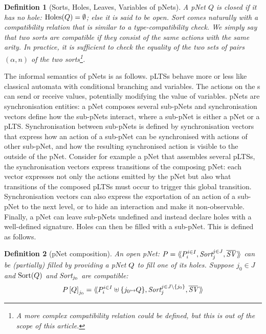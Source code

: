 \documentclass{lmcs}
\newtheorem{definition}{Definition}
\begin{document}
\begin{definition}[Sorts, Holes, Leaves, Variables of pNets]
A pNet $Q$ is \emph{closed} if it has no hole: $\operatorname{Holes}(Q)=\emptyset$; else it
is said to be \emph{open}.
Sort comes naturally with a compatibility relation that is similar to a type-compatibility check. We simply say that two sorts are compatible if they consist of the same actions with the same arity. In practice, it is sufficient to check the equality of the two sets of pairs $(\alpha,n)$ of the two sorts\footnote{A more complex compatibility relation could be defined, but this is out of the scope of this article.}.
\end{definition}
  
The informal semantics of pNets is as follows. pLTSs behave more or less like  classical automata with conditional branching and variables. The actions on the \pLTS s can send or receive values, potentially modifying the value of variables. 
pNets are synchronisation entities: a pNet composes several sub-pNets and  synchronisation vectors define how the sub-pNets interact, where a sub-pNet is either a pNet or a pLTS. Synchronisation between sub-pNets is defined by synchronisation vectors that express how an action of a sub-pNet can be synchronised with actions of other sub-pNet, and how the resulting synchronised action is visible to the outside of the pNet. 
Consider for example a pNet that assembles several pLTSs, the synchronisation vectors express transitions of the composing pNet: each vector expresses not only the actions emitted by the pNet but also what transitions of the composed pLTSs must occur to trigger this global transition.
Synchronisation vectors can also express the exportation of an action of a sub-pNet to the next level, or to hide an interaction and make it non-observable. Finally, a pNet can leave sub-pNets undefined and instead declare holes with a well-defined signature. Holes can then be filled with a sub-pNet. This is defined as follows.



\begin{definition}[pNet composition]
	An open pNet: $\pNet = \mylangle \pNet_i^{i\in I}, \Sort_j^{j\in J}, 
	\set{\symb{SV}}\,\myrangle$
 can be (partially) filled by providing  a pNet $Q$ to fill one of  its holes.	
	Suppose $j_0\in J$ and $\operatorname{Sort}(Q)$ and $\Sort_{j_0}$ are compatible:
	\[\pNet\left[\pNetQ\right]_{j_0}= \mylangle 
	\pNet_i^{i\in I}\uplus\{j_0\mapsto \pNetQ\},\Sort_j^{j\in J\setminus \{j_0\}},
	\set{\symb{SV}}\,\myrangle
	\]
\end{definition}
\end{document}
